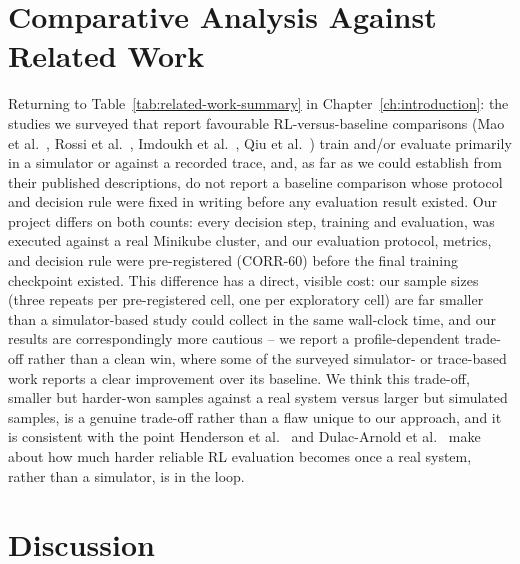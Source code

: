 \section{Comparative Analysis Against Related Work}
\label{sec:comparative-analysis}

Returning to Table~\ref{tab:related-work-summary} in
Chapter~\ref{ch:introduction}: the studies we surveyed that report
favourable RL-versus-baseline comparisons (Mao et al.\
\cite{mao2016resource}, Rossi et al.\ \cite{rossi2019horizontal}, Imdoukh
et al.\ \cite{imdoukh2020lstm}, Qiu et al.\ \cite{qiu2020firm}) train
and/or evaluate primarily in a simulator or against a recorded trace, and,
as far as we could establish from their published descriptions, do not
report a baseline comparison whose protocol and decision rule were fixed
in writing before any evaluation result existed. Our project differs on
both counts: every decision step, training and evaluation, was executed
against a real Minikube cluster, and our evaluation protocol, metrics, and
decision rule were pre-registered (CORR-60) before the final training
checkpoint existed. This difference has a direct, visible cost: our sample
sizes (three repeats per pre-registered cell, one per exploratory cell)
are far smaller than a simulator-based study could collect in the same
wall-clock time, and our results are correspondingly more cautious -- we
report a profile-dependent trade-off rather than a clean win, where some of
the surveyed simulator- or trace-based work reports a clear improvement
over its baseline. We think this trade-off, smaller but harder-won samples
against a real system versus larger but simulated samples, is a genuine
trade-off rather than a flaw unique to our approach, and it is consistent
with the point Henderson et al.\ \cite{henderson2018matters} and
Dulac-Arnold et al.\ \cite{dulacarnold2019challenges} make about how much
harder reliable RL evaluation becomes once a real system, rather than a
simulator, is in the loop.

\section{Discussion}
\label{sec:discussion}

